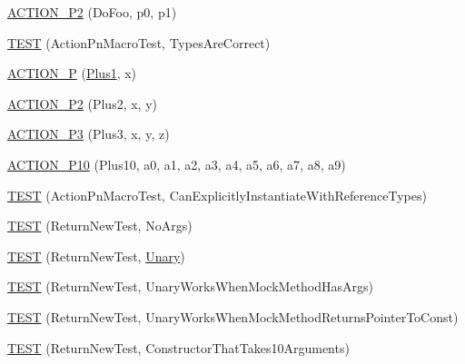 \begin{DoxyCompactItemize}
\item 
\hyperlink{namespacetesting_1_1gmock__generated__actions__test_acd38e742235e154ad309f22e9a470a86}{A\+C\+T\+I\+O\+N\+\_\+\+P2} (Do\+Foo, p0, p1)
\item 
\hyperlink{namespacetesting_1_1gmock__generated__actions__test_ad702feced8b71b3708782b1a2274453e}{T\+E\+ST} (Action\+Pn\+Macro\+Test, Types\+Are\+Correct)
\item 
\hyperlink{namespacetesting_1_1gmock__generated__actions__test_a89c01b82e854ad79e3d139aa72477747}{A\+C\+T\+I\+O\+N\+\_\+P} (\hyperlink{namespacetesting_1_1gmock__generated__actions__test_a75e901c6d28c591c53a54320a294da55}{Plus1}, x)
\item 
\hyperlink{namespacetesting_1_1gmock__generated__actions__test_a0e2768c0fae30bc46ec6e322b29dd54c}{A\+C\+T\+I\+O\+N\+\_\+\+P2} (Plus2, x, y)
\item 
\hyperlink{namespacetesting_1_1gmock__generated__actions__test_afc911947c840aa9857eb2d06e4d80787}{A\+C\+T\+I\+O\+N\+\_\+\+P3} (Plus3, x, y, z)
\item 
\hyperlink{namespacetesting_1_1gmock__generated__actions__test_a4e48e01a7bfc369d279cc0c99a7d3c60}{A\+C\+T\+I\+O\+N\+\_\+\+P10} (Plus10, a0, a1, a2, a3, a4, a5, a6, a7, a8, a9)
\item 
\hyperlink{namespacetesting_1_1gmock__generated__actions__test_a20664d32f08c53d6f9fa5e020a85fab3}{T\+E\+ST} (Action\+Pn\+Macro\+Test, Can\+Explicitly\+Instantiate\+With\+Reference\+Types)
\item 
\hyperlink{namespacetesting_1_1gmock__generated__actions__test_a058a3d17071ddb888319ab71b491af94}{T\+E\+ST} (Return\+New\+Test, No\+Args)
\item 
\hyperlink{namespacetesting_1_1gmock__generated__actions__test_a64f3f8327d51c139b441846e809ae4bc}{T\+E\+ST} (Return\+New\+Test, \hyperlink{namespacetesting_1_1gmock__generated__actions__test_a61f0e6c3f2c07079299f1d6e1667ab92}{Unary})
\item 
\hyperlink{namespacetesting_1_1gmock__generated__actions__test_ad8f696b14b0f2dba4986c53f615aef15}{T\+E\+ST} (Return\+New\+Test, Unary\+Works\+When\+Mock\+Method\+Has\+Args)
\item 
\hyperlink{namespacetesting_1_1gmock__generated__actions__test_ad9f45ddc4a5616b919116c766ad37a30}{T\+E\+ST} (Return\+New\+Test, Unary\+Works\+When\+Mock\+Method\+Returns\+Pointer\+To\+Const)
\item 
\hyperlink{namespacetesting_1_1gmock__generated__actions__test_a1ed6392f4aeb68b9429ff7dd98ce5a86}{T\+E\+ST} (Return\+New\+Test, Constructor\+That\+Takes10\+Arguments)

\end{DoxyCompactItemize}
